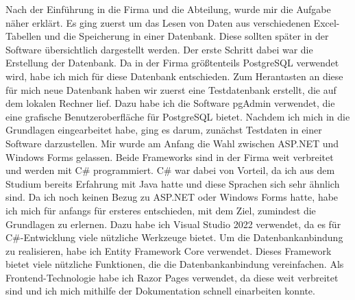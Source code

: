 \documentclass{Vorlage}
\begin{document}
Nach der Einführung in die Firma und die Abteilung, wurde mir die Aufgabe näher erklärt.
Es ging zuerst um das Lesen von Daten aus verschiedenen Excel-Tabellen und die Speicherung
in einer Datenbank. Diese sollten später in der Software übersichtlich dargestellt werden.
Der erste Schritt dabei war die Erstellung der Datenbank. Da in der Firma größtenteils 
PostgreSQL verwendet wird, habe ich mich für diese Datenbank entschieden. Zum Herantasten 
an diese für mich neue Datenbank haben wir zuerst eine Testdatenbank erstellt, die auf dem
lokalen Rechner lief. Dazu habe ich die Software pgAdmin verwendet, die eine grafische
Benutzeroberfläche für PostgreSQL bietet. Nachdem ich mich in die Grundlagen eingearbeitet
habe, ging es darum, zunächst Testdaten in einer Software darzustellen. Mir wurde am Anfang
die Wahl zwischen ASP.NET und Windows Forms gelassen. Beide Frameworks sind in der Firma 
weit verbreitet und werden mit C\# programmiert. C\# war dabei von Vorteil, da ich aus dem Studium
bereits Erfahrung mit Java hatte und diese Sprachen sich sehr ähnlich sind. Da ich
noch keinen Bezug zu ASP.NET oder Windows Forms
hatte, habe ich mich für anfangs für ersteres entschieden, mit dem Ziel, zumindest die Grundlagen zu erlernen.
Dazu habe ich Visual Studio 2022 verwendet, da es für C\#-Entwicklung viele nützliche 
Werkzeuge bietet. Um die Datenbankanbindung zu realisieren, habe ich Entity Framework Core
verwendet. Dieses Framework bietet viele nützliche Funktionen, die die Datenbankanbindung
vereinfachen. Als Frontend-Technologie habe ich Razor Pages verwendet, da diese weit verbreitet
sind und ich mich mithilfe der Dokumentation schnell einarbeiten konnte. 
\end{document}
